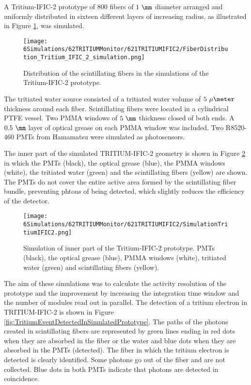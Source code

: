 A Tritium-IFIC-2 prototype of $800$ fibers of $1~\mm$ diameter arranged and uniformly distributed in sixteen different layers of increasing radius, as illustrated in Figure \ref{fig:FibersTritiumIFIC2Simulation}, was simulated.

\begin{figure}[h]
\centering
\texttt{[image: 6Simulations/62TRITIUMMonitor/621TRITIUMIFIC2/FiberDistribution\_Tritium\_IFIC\_2\_simulation.png]}
\caption{Distribution of the scintillating fibers in the simulations of the Tritium-IFIC-2 prototype.\label{fig:FibersTritiumIFIC2Simulation}}
\end{figure}
The tritiated water source consisted of a tritiated water volume of $5~\mu\meter$ thickness around each fiber. Scintillating fibers were located in a cylindrical PTFE vessel. Two PMMA windows of $5~\mm$ thickness closed of both ends. A $0.5~\mm$ layer of optical grease on each PMMA window was included. Two R8520-460 PMTs from Hamamatsu \cite{DataSheetPMTs} were simulated as photosensors. 


The inner part of the simulated TRITIUM-IFIC-2 geometry is shown in Figure \ref{fig:TritiumIFIC2Simulation} in which the PMTs (black), the optical grease (blue), the PMMA windows (white), the tritiated water (green) and the scintillating fibers (yellow) are shown. The PMTs do not cover the entire active area formed by the scintillating fiber bundle, preventing phtons of being detected, which slightly reduces the efficiency of the detector.
\begin{figure}[h]
\centering
\texttt{[image: 6Simulations/62TRITIUMMonitor/621TRITIUMIFIC2/SimulationTritiumIFIC2.png]}
\caption{Simulation of inner part of the Tritium-IFIC-2 prototype. PMTs (black), the optical grease (blue), PMMA windows (white), tritiated water (green) and scintillating fibers (yellow). \label{fig:TritiumIFIC2Simulation}}
\end{figure}
The aim of these simulations was to calculate the activity resolution of the prototype and the improvement by increasing the integration time window and the number of modules read out in parallel. The detection of a tritium electron in TRITIUM-IFIC-2 is shown in Figure \ref{fig:TritiumEventDetectedInSimulatedPrototype}. The paths of the photons created in scintillating fibers are represented by green lines ending in red dots when they are absorbed in the fiber or the water and blue dots when they are absorbed in the PMTs (detected). The fiber in which the tritium electron is detected is clearly identified. Some photons go out of the fiber and are not collected. Blue dots in both PMTs indicate that photons are detected in coincidence.

